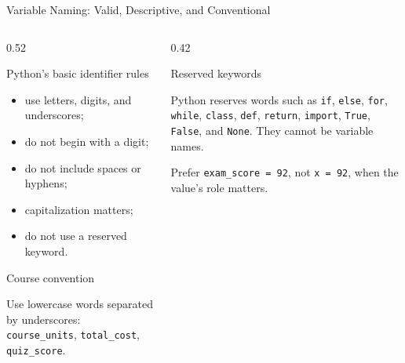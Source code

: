 \documentclass[aspectratio=169,10pt]{beamer}
\begin{document}
\begin{frame}[shrink=8]{Variable Naming: Valid, Descriptive, and Conventional}

  \begin{columns}[T,onlytextwidth]

    \begin{column}{0.52\textwidth}

      \begin{block}{Python's basic identifier rules}

        \begin{itemize}
          \item use letters, digits, and underscores;
          \item do not begin with a digit;
          \item do not include spaces or hyphens;
          \item capitalization matters;
          \item do not use a reserved keyword.
        \end{itemize}

      \end{block}

      \begin{block}{Course convention}

        Use lowercase words separated by underscores: \texttt{course\_units}, \texttt{total\_cost}, \texttt{quiz\_score}.

      \end{block}

    \end{column}

    \begin{column}{0.42\textwidth}

      \begin{block}{Reserved keywords}

        Python reserves words such as \texttt{if}, \texttt{else}, \texttt{for}, \texttt{while}, \texttt{class}, \texttt{def}, \texttt{return}, \texttt{import}, \texttt{True}, \texttt{False}, and \texttt{None}. They cannot be variable names.

      \end{block}

      \begin{exampleblockcp}

        Prefer \texttt{exam\_score = 92}, not \texttt{x = 92}, when the value's role matters.

      \end{exampleblockcp}

    \end{column}

  \end{columns}


\end{frame}
\end{document}

